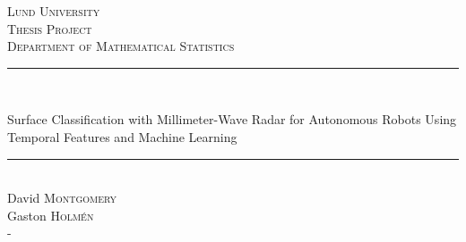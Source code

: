 \begin{titlepage}
\newcommand{\HRule}{\rule{\linewidth}{0.5mm}}

\center
 
\textsc{\LARGE Lund University}\\[1.5cm]
\textsc{\Large Thesis Project}\\[0.5cm]
\textsc{\large Department of Mathematical Statistics}\\[0.5cm]

\HRule \\%
	{ \huge Surface Classification with Millimeter-Wave Radar for Autonomous Robots Using Temporal Features and Machine Learning\par}%
\HRule \\[1.5cm]
 

\Large David \textsc{Montgomery} \\
\Large Gaston \textsc{Holm\'en} \\

\vfill-

\end{titlepage}
